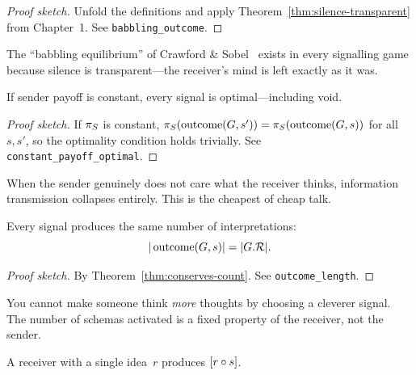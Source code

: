 \begin{proof}[Proof sketch]
Unfold the definitions and apply Theorem~\ref{thm:silence-transparent}
from Chapter~1.  See \texttt{babbling\_outcome}.
\end{proof}

\begin{remark}
The ``babbling equilibrium'' of Crawford \& Sobel~\cite{crawford1982}
exists in every signalling game because silence is transparent---the
receiver's mind is left exactly as it was.
\end{remark}

\begin{theorem}
\label{thm:constant-payoff}
If sender payoff is constant, every signal is optimal---including void.
\end{theorem}

\begin{proof}[Proof sketch]
If $\pi_S$ is constant, $\pi_S(\operatorname{outcome}(G,s'))
= \pi_S(\operatorname{outcome}(G,s))$ for all $s,s'$, so the
optimality condition holds trivially.  See \texttt{constant\_payoff\_optimal}.
\end{proof}

\begin{remark}
When the sender genuinely does not care what the receiver thinks,
information transmission collapses entirely.  This is the cheapest of
cheap talk.
\end{remark}

\begin{theorem}
\label{thm:outcome-length}
Every signal produces the same number of interpretations:
\[
  |\operatorname{outcome}(G, s)| = |G.\mathcal{R}|.
\]
\end{theorem}

\begin{proof}[Proof sketch]
By Theorem~\ref{thm:conserves-count}.  See \texttt{outcome\_length}.
\end{proof}

\begin{remark}
You cannot make someone think \emph{more} thoughts by choosing a
cleverer signal.  The number of schemas activated is a fixed property of
the receiver, not the sender.
\end{remark}

\begin{theorem}
\label{thm:singleton-outcome}
A receiver with a single idea~$r$ produces $[r \circ s]$.
\end{theorem}

